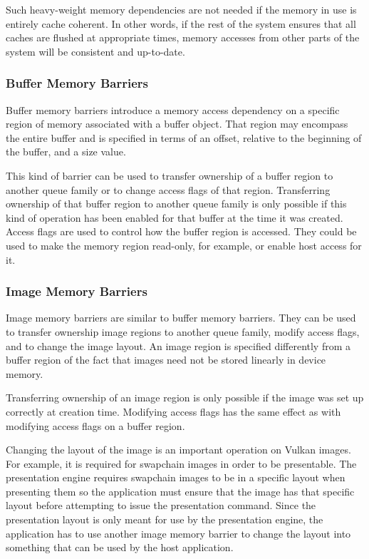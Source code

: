         Such heavy-weight memory dependencies are not needed if the memory in use is entirely cache coherent. In other words, if the rest of the system ensures that all caches are flushed at appropriate times, memory accesses from other parts of the system will be consistent and up-to-date.

      \subsubsection{Buffer Memory Barriers}
        Buffer memory barriers introduce a memory access dependency on a specific region of memory associated with a buffer object. That region may encompass the entire buffer and is specified in terms of an offset, relative to the beginning of the buffer, and a size value.

        This kind of barrier can be used to transfer ownership of a buffer region to another queue family or to change access flags of that region. Transferring ownership of that buffer region to another queue family is only possible if this kind of operation has been enabled for that buffer at the time it was created. Access flags are used to control how the buffer region is accessed. They could be used to make the memory region read-only, for example, or enable host access for it.

      \subsubsection{Image Memory Barriers}
        Image memory barriers are similar to buffer memory barriers. They can be used to transfer ownership image regions to another queue family, modify access flags, and to change the image layout. An image region is specified differently from a buffer region of the fact that images need not be stored linearly in device memory.

        Transferring ownership of an image region is only possible if the image was set up correctly at creation time. Modifying access flags has the same effect as with modifying access flags on a buffer region.

        Changing the layout of the image is an important operation on Vulkan images. For example, it is required for swapchain images in order to be presentable. The presentation engine requires swapchain images to be in a specific layout when presenting them so the application must ensure that the image has that specific layout before attempting to issue the presentation command. Since the presentation layout is only meant for use by the presentation engine, the application has to use another image memory barrier to change the layout into something that can be used by the host application.

